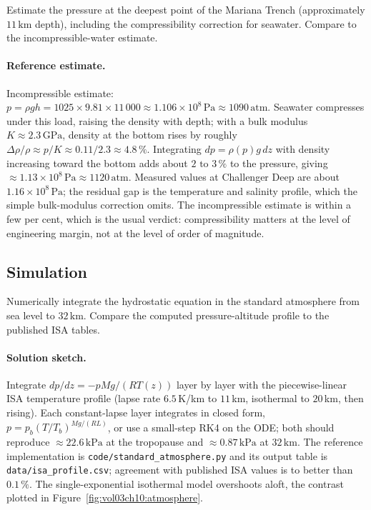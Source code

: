 \begin{exercise}
Estimate the pressure at the deepest point of the Mariana Trench
(approximately $11\,\si{\kilo\meter}$ depth), including the
compressibility correction for seawater. Compare to the
incompressible-water estimate.

\paragraph{Reference estimate.} Incompressible estimate: $p = \rho g h
= 1025 \times 9.81 \times 11\,000 \approx 1.106 \times 10^8\,\text{Pa}
\approx 1090\,\text{atm}$. Seawater compresses under this load, raising
the density with depth; with a bulk modulus $K \approx 2.3\,\text{GPa}$,
density at the bottom rises by roughly $\Delta\rho/\rho \approx p/K
\approx 0.11/2.3 \approx 4.8\,\%$. Integrating $dp = \rho(p) g\,dz$ with
density increasing toward the bottom adds about $2\text{ to }3\,\%$ to
the pressure, giving $\approx 1.13 \times 10^8\,\text{Pa} \approx
1120\,\text{atm}$. Measured values at Challenger Deep are about
$1.16 \times 10^8\,\text{Pa}$; the residual gap is the temperature and
salinity profile, which the simple bulk-modulus correction omits. The
incompressible estimate is within a few per cent, which is the usual
verdict: compressibility matters at the level of engineering margin, not
at the level of order of magnitude.
\end{exercise}

\subsection*{Simulation}

\begin{exercise}
Numerically integrate the hydrostatic equation in the standard
atmosphere from sea level to $32\,\si{\kilo\meter}$. Compare the
computed pressure-altitude profile to the published ISA tables.

\paragraph{Solution sketch.} Integrate $dp/dz = -pMg/(RT(z))$ layer by
layer with the piecewise-linear ISA temperature profile (lapse rate
$6.5\,$K/km to $11\,$km, isothermal to $20\,$km, then rising). Each
constant-lapse layer integrates in closed form, $p = p_b (T/T_b)^{Mg/(RL)}$,
or use a small-step RK4 on the ODE; both should reproduce
$\approx 22.6\,\text{kPa}$ at the tropopause and $\approx 0.87\,\text{kPa}$
at $32\,\si{\kilo\meter}$. The reference implementation is
\texttt{code/standard\_atmosphere.py} and its output table is
\texttt{data/isa\_profile.csv}; agreement with published ISA values is to
better than $0.1\,\%$. The single-exponential isothermal model
overshoots aloft, the contrast plotted in
Figure~\ref{fig:vol03ch10:atmosphere}.
\end{exercise}

